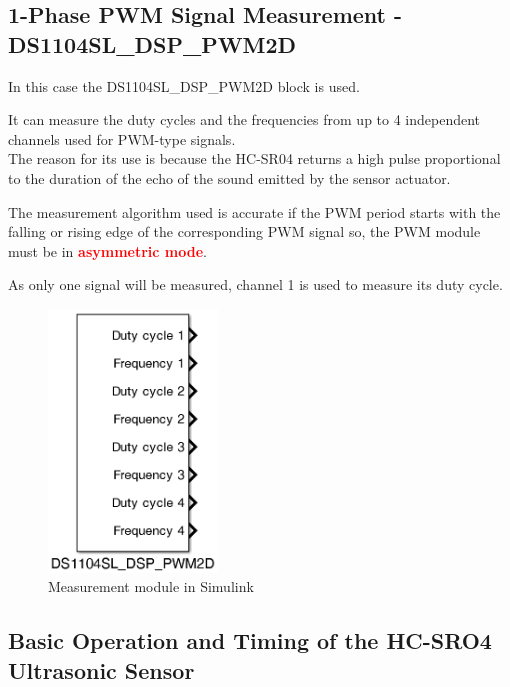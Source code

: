 \subsection{1-Phase PWM Signal Measurement - DS1104SL\_DSP\_PWM2D}
In this case the DS1104SL\_DSP\_PWM2D block is used.\par
It can measure the duty cycles and the frequencies from up to 4 independent channels used for PWM-type signals.\\
The reason for its use is because the HC-SR04 returns a high pulse proportional to the duration of the echo of the sound emitted by the sensor actuator.\par
The measurement algorithm used is accurate if the PWM period starts
with the falling or rising edge of the corresponding PWM signal so, the PWM module must be in \textcolor{red}{\textbf{asymmetric mode}}.\par
As only one signal will be measured, channel 1 is used to measure its duty cycle.


    \begin{figure}[H]
        \centering
        \includegraphics[width=0.4\textwidth]{Images/Ball and Bean/MatLab15.png}
        \caption{Measurement module in Simulink}
        \label{fig19}
    \end{figure}

\newpage

\subsection{Basic Operation and Timing of the HC-SRO4 Ultrasonic Sensor}

